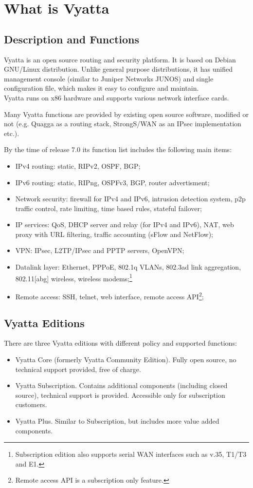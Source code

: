 \chapter{What is Vyatta}
\section{Description and Functions}
Vyatta is an open source routing and security platform. It is based on Debian GNU/Linux distribution. 
Unlike general purpose distributions, it has unified management console (similar to Juniper Networks JUNOS) 
and single configuration file, which makes it easy to configure and maintain. \\
Vyatta runs on x86 hardware and supports various network interface cards. 

Many Vyatta functions are provided by existing open source software, modified or not (e.g. Quagga as a 
routing stack, StrongS/WAN as an IPsec implementation etc.).

By the time of release 7.0 its function list includes the following main items:
\begin{itemize}
 \item IPv4 routing: static, RIPv2, OSPF, BGP;
 \item IPv6 routing: static, RIPng, OSPFv3, BGP, router advertisment;
 \item Network security: firewall for IPv4 and IPv6, intrusion detection system, p2p traffic control, rate limiting,
 time based rules, stateful failover;
 \item IP services: QoS, DHCP server and relay (for IPv4 and IPv6), NAT, web proxy with URL filtering, traffic
 accounting (sFlow and NetFlow);
 \item VPN: IPsec, L2TP/IPsec and PPTP servers, OpenVPN;
 \item Datalink layer: Ethernet, PPPoE, 802.1q VLANs, 802.3ad link aggregation, 802.11[abg] wireless, wireless
 modems;\footnote{Subscription edition also supports serial WAN interfaces such as v.35, T1/T3 and E1.}
 \item Remote access: SSH, telnet, web interface, remote access API\footnote{Remote access API is a subscription
 only feature.};
\end{itemize}

\section{Vyatta Editions}
There are three Vyatta editions with different policy and supported functions:
\begin{itemize}
 \item Vyatta Core (formerly Vyatta Community Edition). Fully open source, no technical support provided, free of
 charge.
 \item Vyatta Subscription. Contains additional components (including closed source), technical support is provided.
 Accessible only for subscription customers.
 \item Vyatta Plus. Similar to Subscription, but includes more value added components. 
\end{itemize}

